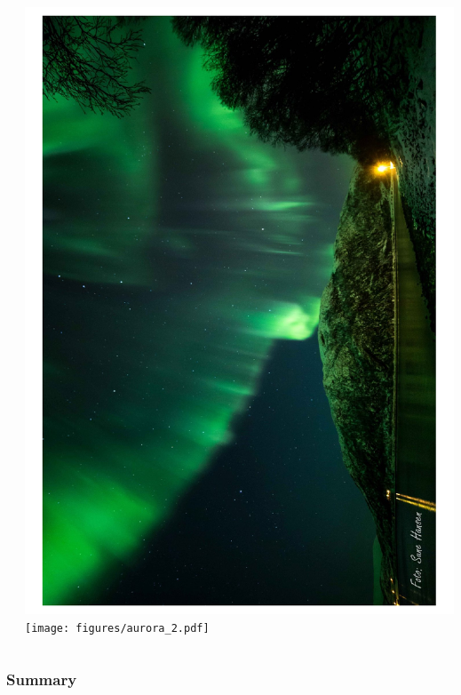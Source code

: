 \documentclass[mathserif,8pt]{beamer}
\begin{document}
\begin{frame}
\begin{columns}
\begin{column}{.60\textwidth}
    \end{column}
    \begin{column}{.40\textwidth}
	\centering
	\includegraphics[viewport = 0 0 600 800, clip, scale=0.15, angle = -90]{figures/aurora.pdf}\\
	\texttt{[image: figures/aurora\_2.pdf]}
    \end{column}
    \end{columns}
\end{frame}

\begin{frame}
    \frametitle{Summary}
\end{frame}
\end{document}
